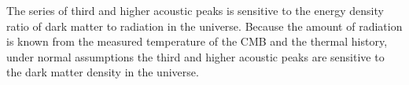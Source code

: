 \documentclass[12pt]{report}
\begin{document}
 The series of third and higher acoustic peaks is sensitive to the energy density ratio of dark matter to radiation in the universe.  Because the amount of radiation is known from the measured temperature of the CMB and the thermal history, under normal assumptions the third and higher acoustic peaks are sensitive to the dark matter density in the universe.%
  
\end{document}

